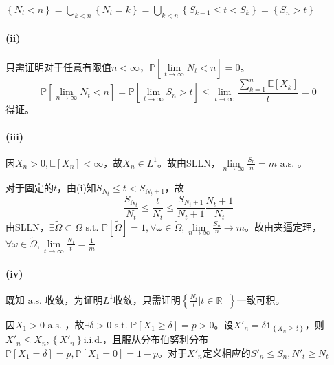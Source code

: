 \documentclass{ctexart}
\begin{document}
$\left\{ N_t<n \right\}=\bigcup\limits_{k<n}\left\{ N_t=k \right\}=\bigcup\limits_{k<n}\left\{ S_{k-1}\leq t<S_k \right\}=\left\{ S_n>t \right\}$
\paragraph{(ii)}
只需证明对于任意有限值$n<\infty$，$\mathbb{P}\left[ \lim\limits_{t\to\infty}N_t<n \right]=0$。
\[\mathbb{P}\left[ \lim\limits_{n\to \infty}N_t<n \right]=\mathbb{P}\left[ \lim\limits_{t\to \infty}S_n>t \right]\leq \lim\limits_{t\to \infty}\frac{\sum\limits_{k=1}^n \underset{}{\mathbb{E}}\left[ X_k\right] }{t}=0\]
得证。
\paragraph{(iii)}
因$X_n>0, \underset{}{\mathbb{E}}\left[ X_n\right]<\infty $，故$X_n\in L^1$。故由SLLN，$\lim\limits_{n\to\infty}\frac{S_n}{n}=m \text{ a.s. }$。

对于固定的$t$，由(i)知$S_{N_t}\leq t< S_{N_t+1}$，故
\begin{equation*}
\frac{S_{N_t}}{N_t}\leq \frac{t}{N_t}\leq \frac{S_{N_t+1}}{N_t+1}\frac{N_t+1}{N_t}
\end{equation*}
由SLLN，$\exists \tilde{\Omega}\subset \Omega \text{ s.t. } \mathbb{P}\left[ \tilde{\Omega} \right]=1, \forall \omega\in \tilde{\Omega}, \lim\limits_{n\to\infty}\frac{S_n}{n}\to m$。故由夹逼定理，$\forall \omega\in \tilde{\Omega}, \lim\limits_{t\to \infty}\frac{N_t}{t}=\frac{1}{m}$
\paragraph{(iv)}
既知$\text{ a.s. }$收敛，为证明$L^1$收敛，只需证明$\left\{ \frac{N_t}{t}| t\in \mathbb{R}_+ \right\}$一致可积。

因$X_1>0 \text{ a.s. }$，故$\exists \delta>0 \text{ s.t. } \mathbb{P}\left[ X_1\geq \delta \right]=p>0$。设$X'_{n}=\delta \mathbf{1}_{\left\{ X_n\geq \delta \right\}}$，则$X'_n\leq X_n, \left\{ X'_n \right\} $i.i.d.，且服从分布伯努利分布$\mathbb{P}\left[ X_1= \delta \right]= p, \mathbb{P}\left[ X_1=0 \right]=1-p$。对于$X'_n$定义相应的$S'_n\leq S_n,N'_t\geq N_t$
\end{document}
